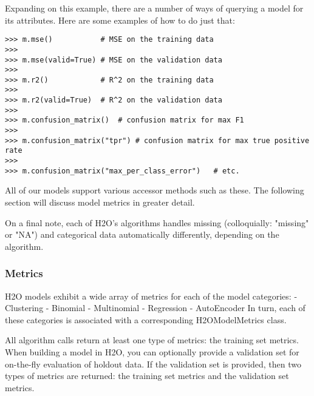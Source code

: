 Expanding on this example, there are a number of ways of querying a model for its attributes. Here are some examples of how to do just that:
\begin{lstlisting}[style=python]
>>> m.mse()           # MSE on the training data
>>>
>>> m.mse(valid=True) # MSE on the validation data
>>>
>>> m.r2()            # R^2 on the training data
>>>
>>> m.r2(valid=True)  # R^2 on the validation data
>>>
>>> m.confusion_matrix()  # confusion matrix for max F1
>>>
>>> m.confusion_matrix("tpr") # confusion matrix for max true positive rate
>>>
>>> m.confusion_matrix("max_per_class_error")   # etc.
\end{lstlisting}

All of our models support various accessor methods such as these. The following section will discuss model metrics in greater detail.

On a final note, each of H2O's algorithms handles missing (colloquially: "missing" or "NA") and categorical data automatically differently, depending on the algorithm. 

\subsubsection{Metrics}

H2O models exhibit a wide array of metrics for each of the model categories: - Clustering - Binomial - Multinomial - Regression - AutoEncoder In turn, each of these categories is associated with a corresponding H2OModelMetrics class.

All algorithm calls return at least one type of metrics: the training set metrics. When building a model in H2O, you can optionally provide a validation set for on-the-fly evaluation of holdout data. If the validation set is provided, then two types of metrics are returned: the training set metrics and the validation set metrics.

